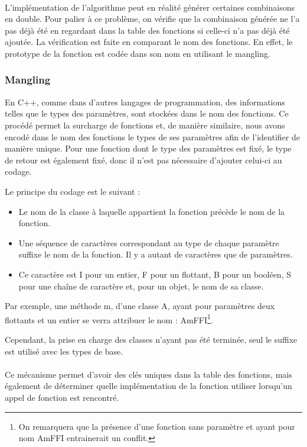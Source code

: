 \documentclass[12pt]{article}
\begin{document}
\paragraph{}L'implémentation de l'algorithme peut en réalité générer certaines combinaisons en double. Pour palier à ce problème, on vérifie que la combinaison générée ne l'a pas déjà été en regardant dans la table des fonctions si celle-ci n'a pas déjà été ajoutée. La vérification est faite en comparant le nom des fonctions. En effet, le prototype de la fonction est codée dans son nom en utilisant le mangling.

\subsubsection{Mangling}

En C++, comme dans d'autres langages de programmation, des informations telles
que le types des paramètres, sont stockées dans le nom des fonctions. Ce procédé
permet la surcharge de fonctions et, de manière similaire, nous avons encodé dans le nom des fonctions le types de ses paramètres afin de l'identifier de manière unique. Pour une fonction dont le type des paramètres est fixé, le type de retour est également fixé, donc il n'est pas nécessaire d'ajouter celui-ci au codage.

Le principe du codage est le suivant :
\begin{itemize}
	\item Le nom de la classe à laquelle appartient la fonction précède le nom de la fonction.
	\item Une séquence de caractères correspondant au type de chaque paramètre suffixe le nom de la fonction. Il y a autant de caractères que de paramètres.
	\item Ce caractère est I pour un entier, F pour un flottant, B pour un booléen, S pour une chaîne de caractère et, pour un objet, le nom de sa classe.
\end{itemize}

Par exemple, une méthode m, d'une classe A, ayant pour paramètres deux flottants et un entier se verra attribuer le nom : AmFFI\footnote{On remarquera que la présence d'une fonction sans paramètre et ayant pour nom AmFFI entrainerait un conflit.}.

Cependant, la prise en charge des classes n'ayant pas été terminée, seul le suffixe est utilisé avec les types de base.

\paragraph{}Ce mécanisme permet d'avoir des clés uniques dans la table des fonctions, mais également de déterminer quelle implémentation de la fonction utiliser lorsqu'un appel de fonction est rencontré.
\end{document}
